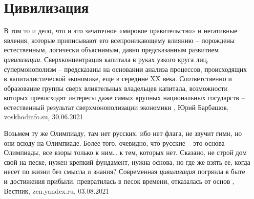  
 
 
 
 
\chapter{Цивилизация}
\label{sec:slova.civilizacia}

В том то и дело, что и это зачаточное «мировое правительство» и негативные
явления, которые приписывают его всепроникающему влиянию – порождены
естественным, логически объяснимым, давно предсказанным развитием \emph{цивилизации}.
Сверхконцентрация капитала в руках узкого круга лиц, супермонополизм –
предсказаны на основании анализа процессов, происходящих в капиталистической
экономике, еще в середине XX века. Соответственно и образование группы сверх
влиятельных владельцев капитала, возможности которых превосходят интересы даже
самых крупных национальных государств – естественный результат
сверхмонополизации экономики
, 
Юрий Барбашов, voskhodinfo.su, 30.06.2021

Возьмем ту же Олимпиаду, там нет русских, ибо нет флага, не звучит гимн, но они
всюду на Олимпиаде. Более того, очевидно, что русские – это основа Олимпиады,
все взоры только к ним… к тем, которых нет.  Сказано, не строй дом свой на
песке, нужен крепкий фундамент, нужна основа, но где же взять ее, когда несет
по жизни без смысла и знания? Современная \emph{цивилизация} погрязла в быте и
достижения прибыли, превратилась в песок времени, отказалась от основ
, Вестник, zen.yandex.ru, 03.08.2021
